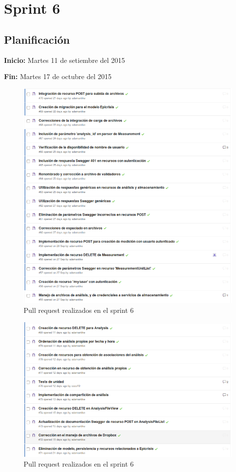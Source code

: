 \documentclass[a4paper,12pt]{article}
\begin{document}




\section{Sprint 6} %
\subsection{Planificación}

\textbf{Inicio: }Martes 11 de setiembre del 2015 

\textbf{Fin:} Martes 17 de octubre del 2015

\begin{figure}[h!]
  \centering
  \includegraphics[width=.8\textwidth]{img/6-PR_1}
  \caption{Pull request realizados en el sprint  6}
  \label{6-PR_1}
\end{figure}

\begin{figure}[h!]
	\centering
	\includegraphics[width=.8\textwidth]{img/6-PR_2}
	\caption{Pull request realizados en el sprint 6}
	\label{6-PR_1}
\end{figure}
\clearpage
\end{document}
